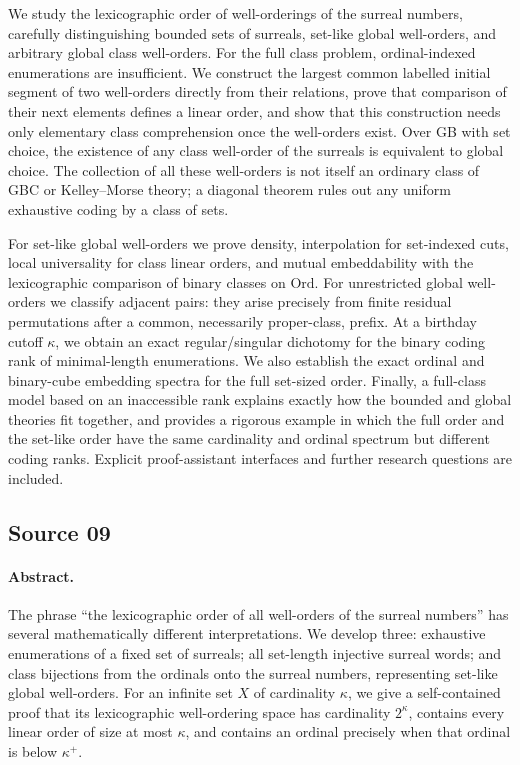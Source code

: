 \documentclass[11pt]{article}
\theoremstyle{definition}
\theoremstyle{remark}
\newcommand{\Ord}{\mathrm{Ord}}
\begin{document}
We study the lexicographic order of well-orderings of the surreal numbers,
carefully distinguishing bounded sets of surreals, set-like global
well-orders, and arbitrary global class well-orders. For the full class
problem, ordinal-indexed enumerations are insufficient. We construct the
largest common labelled initial segment of two well-orders directly from
their relations, prove that comparison of their next elements defines a
linear order, and show that this construction needs only elementary class
comprehension once the well-orders exist. Over GB with set choice, the
existence of any class well-order of the surreals is equivalent to global
choice. The collection of all these well-orders is not itself an ordinary
class of GBC or Kelley--Morse theory; a diagonal theorem rules out any
uniform exhaustive coding by a class of sets.

For set-like global well-orders we prove density, interpolation for
set-indexed cuts, local universality for class linear orders, and mutual
embeddability with the lexicographic comparison of binary classes on
$\Ord$. For unrestricted global well-orders we classify adjacent pairs:
they arise precisely from finite residual permutations after a common,
necessarily proper-class, prefix. At a birthday cutoff $\kappa$, we obtain
an exact regular/singular dichotomy for the binary coding rank of
minimal-length enumerations. We also establish the exact ordinal and
binary-cube embedding spectra for the full set-sized order. Finally, a
full-class model based on an inaccessible rank explains exactly how the
bounded and global theories fit together, and provides a rigorous example
in which the full order and the set-like order have the same cardinality
and ordinal spectrum but different coding ranks. Explicit proof-assistant
interfaces and further research questions are included.


\subsection*{Source 09}
\paragraph{Abstract.}

The phrase ``the lexicographic order of all well-orders of the surreal
numbers'' has several mathematically different interpretations. We develop
three: exhaustive enumerations of a fixed set of surreals; all set-length
injective surreal words; and class bijections from the ordinals onto the
surreal numbers, representing set-like global well-orders. For an infinite
set $X$ of cardinality $\kappa$, we give a self-contained proof that its
lexicographic well-ordering space has cardinality $2^\kappa$, contains every
linear order of size at most $\kappa$, and contains an ordinal precisely when
that ordinal is below $\kappa^+$.
\end{document}
